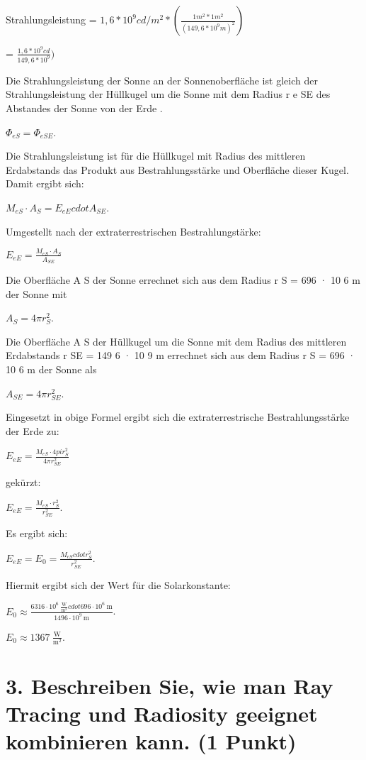 \documentclass[12pt]{scrreprt}
\begin{document}
Strahlungsleistung = $1,6 * 10^9 cd/m^2 * (\frac{1m^2 * 1m^2}{(149,6*10^9m)^2})$

= $\frac{1,6 * 10^9 cd}{149,6*10^9})$




Die Strahlungsleistung der Sonne an der Sonnenoberfläche ist gleich der Strahlungsleistung der Hüllkugel um die Sonne mit dem Radius r e SE des Abstandes der Sonne von der Erde .

$\Phi_{e S} = \Phi_{e SE}$. 

Die Strahlungsleistung ist für die Hüllkugel mit Radius des mittleren Erdabstands das Produkt aus Bestrahlungsstärke und Oberfläche dieser Kugel. Damit ergibt sich:

$M_{e S} \cdot A_S = E_{e E} cdot A_{SE}$. 

Umgestellt nach der extraterrestrischen Bestrahlungstärke:

$E_{e E} = \frac{M_{e S} \cdot A_S}{A_{SE}}$ 

Die Oberfläche A S der Sonne errechnet sich aus dem Radius r S = 696 · 10 6 m der Sonne mit

$A_S = 4 \pi r_S^2$. 

Die Oberfläche A S der Hüllkugel um die Sonne mit dem Radius des mittleren Erdabstands r SE = 149 6 · 10 9 m errechnet sich aus dem Radius r S = 696 · 10 6 m der Sonne als

$A_{SE} = 4 \pi r_{SE}^2$. 

Eingesetzt in obige Formel ergibt sich die extraterrestrische Bestrahlungsstärke der Erde zu:

$E_{e E} = \frac{M_{e S} \cdot 4 pi r_S^2}{4 \pi r_{SE}^2}$ 

gekürzt:

$E_{e E} = \frac{M_{e S} \cdot r_S^2}{r_{SE}^2}$. 

Es ergibt sich:

$E_{e E} = E_0 = \frac{M_{e S} cdot r_S^2}{r_{SE}^2}$. 

Hiermit ergibt sich der Wert für die Solarkonstante:

$E_0 \approx \frac{63 16 \cdot 10^6\ \mathrm{\frac{W}{m^2}} cdot 696\cdot 10^6\ \mathrm{m}}{149 6 \cdot 10^9\ \mathrm{m}}$. 

$E_0 \approx 1367\ \mathrm{\frac{W}{m^2}}$.




\section*{3. Beschreiben Sie, wie man Ray Tracing und Radiosity geeignet kombinieren kann. (1 Punkt)}
\end{document}
